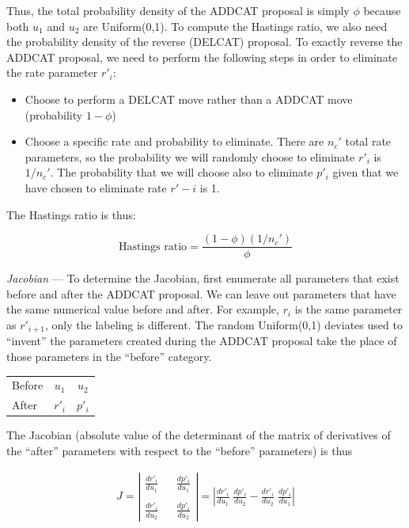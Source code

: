 \documentclass[12pt]{article}
\newcommand{\ncat}{n_c}
\begin{document}
Thus, the total probability density of the ADDCAT proposal is simply $\phi$ because both $u_1$ and $u_2$ are Uniform(0,1). To compute the Hastings ratio, we also need the probability density of the reverse (DELCAT) proposal. To exactly reverse the ADDCAT proposal, we need to perform the following steps in order to eliminate the rate parameter $r'_i$:

\begin{itemize}
\item Choose to perform a DELCAT move rather than a ADDCAT move (probability $1-\phi$)
\item Choose a specific rate and probability to eliminate. There are $\ncat'$ total rate parameters, so the probability we will randomly choose to eliminate $r'_i$ is $1/\ncat'$. The probability that we will choose also to eliminate $p'_i$ given that we have chosen to eliminate rate $r'-i$ is 1.
\end{itemize}

The Hastings ratio is thus:

\[ \mbox{Hastings ratio} = \frac{(1-\phi)(1/\ncat')}{\phi} \]

{\em Jacobian} --- To determine the Jacobian, first enumerate all parameters that exist before and after the ADDCAT proposal. We can leave out parameters that have the same numerical value before and after. For example, $r_{i}$ is the same parameter as $r'_{i+1}$, only the labeling is different. The random Uniform(0,1) deviates used to ``invent'' the parameters created during the ADDCAT proposal take the place of those parameters in the ``before'' category.

\begin{center}
\begin{tabular}{lcc}
Before & $u_1$  & $u_2$ \\
After  & $r'_i$ & $p'_i$
\end{tabular}
\end{center}

The Jacobian (absolute value of the determinant of the matrix of derivatives of the ``after'' parameters with respect to the ``before'' parameters) is thus

\begin{eqnarray*}
J = \left| 
\begin{array}{ccc}
\frac{d r'_i}{d u_1} & & \frac{d p'_i}{d u_1} \\
& & \\
\frac{d r'_i}{d u_2} & & \frac{d p'_i}{d u_2}
\end{array}
\right|
= \left| \frac{d r'_i}{d u_1} \; \frac{d p'_i}{d u_2} - \frac{d r'_i}{d u_2} \; \frac{d p'_i}{d u_1} \right|
\end{eqnarray*}
\end{document}
